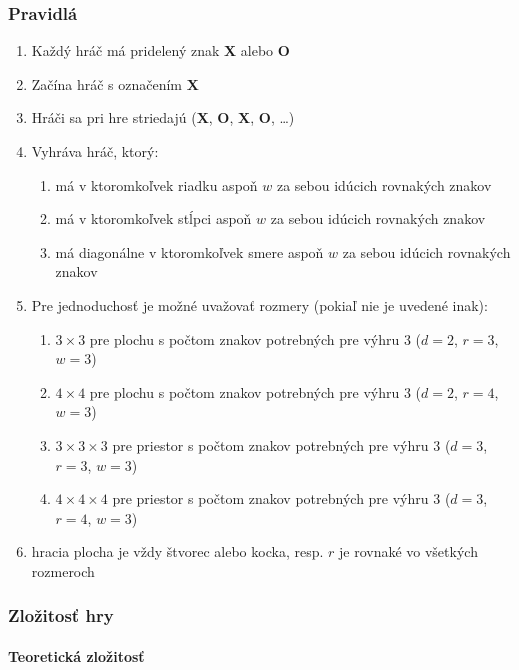 \subsubsection{Pravidlá}

\begin{enumerate}
    \item Každý hráč má pridelený znak \textbf{X} alebo \textbf{O}
    \item Začína hráč s označením \textbf{X}
    \item Hráči sa pri hre striedajú (\textbf{X}, \textbf{O}, \textbf{X}, \textbf{O}, \ldots)
    \item Vyhráva hráč, ktorý:
    \begin{enumerate}
        \item má v ktoromkoľvek riadku aspoň $w$ za sebou idúcich rovnakých znakov
        \item má v ktoromkoľvek stĺpci aspoň $w$ za sebou idúcich rovnakých znakov
        \item má diagonálne v ktoromkoľvek smere aspoň $w$ za sebou idúcich rovnakých znakov
    \end{enumerate}
    \item Pre jednoduchosť je možné uvažovať rozmery (pokiaľ nie je uvedené inak):
    \begin{enumerate}
        \item $3 \times 3$ pre plochu s počtom znakov potrebných pre výhru 3 ($d = 2$, $r = 3$, $w = 3$)
        \item $4 \times 4$ pre plochu s počtom znakov potrebných pre výhru 3 ($d = 2$, $r = 4$, $w = 3$)
        \item $3 \times 3 \times 3$ pre priestor s počtom znakov potrebných pre výhru 3 ($d = 3$, $r = 3$, $w = 3$)
        \item $4 \times 4 \times 4$ pre priestor s počtom znakov potrebných pre výhru 3 ($d = 3$, $r = 4$, $w = 3$)
    \end{enumerate}
    \item hracia plocha je vždy štvorec alebo kocka, resp. $r$ je rovnaké vo všetkých rozmeroch
\end{enumerate}

\subsubsection{Zložitosť hry}

\paragraph{Teoretická zložitosť}

